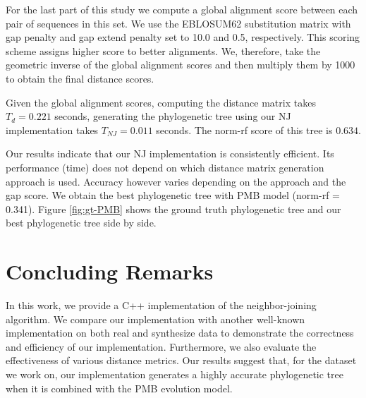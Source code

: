 \documentclass[11pt,letterpaper]{article}
\newcommand\kcomment[1]{\textcolor{blue}{#1 - Khanh}}
\theoremstyle{definition}
\begin{document}


For the last part of this study we compute a global alignment score between each pair of sequences in this set. We use the EBLOSUM62 substitution matrix with gap penalty and gap extend penalty set to 10.0 and 0.5, respectively. This scoring scheme assigns higher score to better alignments. We, therefore, take the geometric inverse of the global alignment scores and then multiply them by 1000 to obtain the final distance scores.

Given the global alignment scores, computing the distance matrix takes $T_d=0.221$ seconds, generating the phylogenetic tree using our NJ implementation takes $T_{NJ} = 0.011$ seconds. The norm-rf score of this tree is $0.634$.

Our results indicate that our NJ implementation is consistently efficient. Its performance (time) does not depend on which distance matrix generation approach is used. Accuracy however varies depending on the approach and the gap score. We obtain the best phylogenetic tree with PMB model (norm-rf = 0.341). Figure \ref{fig:gt-PMB} shows the ground truth phylogenetic tree and our best phylogenetic tree side by side. 

\section{Concluding Remarks}

In this work, we provide a C++ implementation of the neighbor-joining algorithm. We compare our implementation with another well-known implementation on both real and synthesize data to demonstrate the correctness and efficiency of our implementation. Furthermore, we also evaluate the effectiveness of various distance metrics. Our results suggest that, for the dataset we work on, our implementation generates a highly accurate phylogenetic tree when it is combined with the PMB evolution model.




\end{document}
